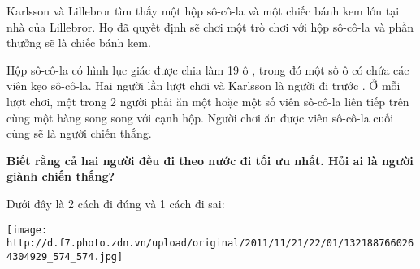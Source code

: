 Karlsson và Lillebror tìm thấy một hộp sô-cô-la và một chiếc bánh kem lớn tại nhà của Lillebror. Họ đã quyết định sẽ chơi một trò chơi với hộp sô-cô-la và phần thưởng sẽ là chiếc bánh kem.  

   Hộp sô-cô-la có hình lục giác được chia làm       19 ô      , trong đó một số ô có chứa các viên kẹo sô-cô-la. Hai người lần lượt chơi và       Karlsson là người đi trước      . Ở mỗi lượt chơi, một trong 2 người phải ăn một hoặc một số viên sô-cô-la liên tiếp trên cùng một hàng song song với cạnh hộp. Người chơi ăn được viên sô-cô-la cuối cùng sẽ là người chiến thắng.  

\textbf{    Biết rằng cả hai người đều đi theo nước đi tối ưu nhất. Hỏi ai là người giành chiến thắng?   }

   Dưới đây là 2 cách đi đúng và 1 cách đi sai:  


\texttt{[image: http://d.f7.photo.zdn.vn/upload/original/2011/11/21/22/01/1321887660264304929\_574\_574.jpg]}

\
